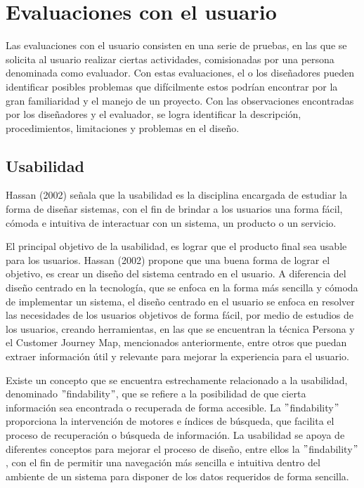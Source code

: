\section{Evaluaciones con el usuario}
\label{EvaluacionesCap3}

Las evaluaciones con el usuario consisten en una serie de pruebas, en las que se solicita al usuario realizar ciertas actividades, comisionadas por una persona denominada como evaluador. Con estas evaluaciones, el o los diseñadores pueden identificar posibles problemas que difícilmente estos podrían encontrar por la gran familiaridad y el manejo de un proyecto. Con las observaciones encontradas por los diseñadores y el evaluador, se logra identificar la descripción, procedimientos, limitaciones y problemas en el diseño.


\subsection{Usabilidad}
\label{UsabilidadCap3}

Hassan (2002) señala que la usabilidad es la disciplina encargada de estudiar la forma de diseñar sistemas, con el fin de brindar a los usuarios una forma fácil, cómoda e intuitiva de interactuar con un sistema, un producto o un servicio.

El principal objetivo de la usabilidad, es lograr que el producto final sea usable para los usuarios. Hassan (2002) propone que una buena forma de lograr el objetivo, es crear un diseño del sistema centrado en el usuario. A diferencia del diseño centrado en la tecnología, que se enfoca en la forma más sencilla y cómoda de implementar un sistema, el diseño centrado en el usuario se enfoca en resolver las necesidades de los usuarios objetivos de forma fácil, por medio de estudios de los usuarios, creando herramientas, en las que se encuentran la técnica Persona y el Customer Journey Map, mencionados anteriormente, entre otros que puedan extraer información útil y relevante para mejorar la experiencia para el usuario.

Existe un concepto que se encuentra estrechamente relacionado a la usabilidad, denominado $"$findability$"$, que se refiere a la posibilidad de que cierta información sea encontrada o recuperada de forma accesible. La $"$findability$"$ proporciona la intervención de motores e índices de búsqueda, que facilita el proceso de recuperación o búsqueda de información. La usabilidad se apoya de diferentes conceptos para mejorar el proceso de diseño, entre ellos la $"$findability$"$, con el fin de permitir una navegación más sencilla e intuitiva dentro del ambiente de un sistema para disponer de los datos requeridos de forma sencilla.

